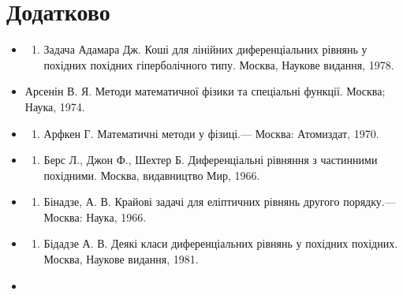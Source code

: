 \documentclass[
  ukrainian,
]{article}
\providecommand{\tightlist}{%
  \setlength{\itemsep}{0pt}\setlength{\parskip}{0pt}}
\begin{document}
\section{Додатково}\label{ux434ux43eux434ux430ux442ux43aux43eux432ux43e}

\begin{itemize}
\tightlist
\item
  \begin{enumerate}
  \def\labelenumi{\arabic{enumi}.}
  \setcounter{enumi}{6}
  \tightlist
  \item
    Задача Адамара Дж. Коші для лінійних диференціальних рівнянь у
    похідних похідних гіперболічного типу. Москва, Наукове видання,
    1978.
  \end{enumerate}
\item
  Арсенін В. Я. Методи математичної фізики та спеціальні функції.
  Москва; Наука, 1974.
\item
  \begin{enumerate}
  \def\labelenumi{\arabic{enumi}.}
  \setcounter{enumi}{8}
  \tightlist
  \item
    Арфкен Г. Математичні методи у фізиці.--- Москва: Атомиздат, 1970.
  \end{enumerate}
\item
  \begin{enumerate}
  \def\labelenumi{\arabic{enumi}.}
  \setcounter{enumi}{9}
  \tightlist
  \item
    Берс Л., Джон Ф., Шехтер Б. Диференціальні рівняння з частинними
    похідними. Москва, видавництво Мир, 1966.
  \end{enumerate}
\item
  \begin{enumerate}
  \def\labelenumi{\arabic{enumi}.}
  \setcounter{enumi}{10}
  \tightlist
  \item
    Бінадзе, А. В. Крайові задачі для еліптичних рівнянь другого
    порядку.--- Москва: Наука, 1966.
  \end{enumerate}
\item
  \begin{enumerate}
  \def\labelenumi{\arabic{enumi}.}
  \setcounter{enumi}{11}
  \tightlist
  \item
    Бідадзе А. В. Деякі класи диференціальних рівнянь у похідних
    похідних. Москва, Наукове видання, 1981.
  \end{enumerate}
\item
  \begin{enumerate}
  \def\labelenumi{\arabic{enumi}.}
  \setcounter{enumi}{12}

\end{enumerate}
\end{itemize}
\end{document}
